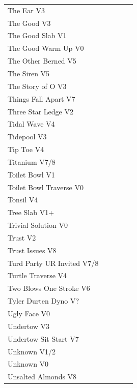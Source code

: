 \begin{flushleft}
\begin{center}
\begin{supertabular}{p{0.76\linewidth}p{0.08\linewidth}}
The Ear V3 & \pageref{rt:The Ear} \\
The Good V3 & \pageref{rt:The Good} \\
The Good Slab V1 & \pageref{rt:The Good Slab} \\
The Good Warm Up V0 & \pageref{rt:The Good Warm Up} \\
The Other Berned V5 & \pageref{rt:The Other Berned} \\
The Siren V5 & \pageref{rt:The Siren} \\
The Story of O V3 & \pageref{rt:The Story of O} \\
Things Fall Apart V7 & \pageref{rt:PA 2} \\
Three Star Ledge V2 & \pageref{rt:Three Star Ledge} \\
Tidal Wave V4 & \pageref{rt:DSD 3} \\
Tidepool V3 & \pageref{rt:Tidepool} \\
Tip Toe V4 & \pageref{rt:Tip Toe} \\
Titanium V7/8 & \pageref{rt:Titanium} \\
Toilet Bowl V1 & \pageref{rt:Toilet Bowl} \\
Toilet Bowl Traverse V0 & \pageref{rt:Toilet Bowl Traverse} \\
Tonsil V4 & \pageref{rt:Tonsil} \\
Tree Slab V1+ & \pageref{rt:Tree Slab} \\
Trivial Solution V0 & \pageref{vr:Trivial Solution} \\
Trust V2 & \pageref{rt:Trust} \\
Trust Issues V8 & \pageref{rt:Trust Issues} \\
Turd Party UR Invited V7/8 & \pageref{rt:Turd Party UR Invited} \\
Turtle Traverse V4 & \pageref{vr:Turtle Traverse} \\
Two Blows One Stroke V6 & \pageref{rt:Two Blows One Stroke} \\
Tyler Durten Dyno V? & \pageref{vr:Tyler Durten Dyno} \\
Ugly Face V0 & \pageref{rt:Ugly Face} \\
Undertow V3 & \pageref{rt:Undertow} \\
Undertow Sit Start V7 & \pageref{vr:Undertow Sit Start} \\
Unknown V1/2 & \pageref{rt:Unknown on E's Dirty B} \\
Unknown V0 & \pageref{rt:Cuneiform1} \\
Unsalted Almonds V8 & \pageref{rt:Unsalted Almonds} \\

\end{supertabular}
\end{center}
\end{flushleft}
